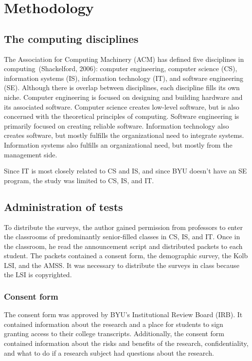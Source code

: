 \chapter{Methodology}\label{chp:chapter3}
\section{The computing disciplines}
The Association for Computing Machinery (ACM) has defined five disciplines in com\-put\-ing~(Shackelford, 2006): computer engineering, computer science (CS), information systems (IS), information technology (IT), and software engineering (SE). Although there is overlap between disciplines, each discipline fills its own niche. Computer engineering is focused on designing and building hardware and its associated software. Computer science creates low-level software, but is also concerned with the theoretical principles of computing. Software engineering is primarily focused on creating reliable software. Information technology also creates software, but mostly fulfills the organizational need to integrate systems. Information systems also fulfills an organizational need, but mostly from the management side.

Since IT is most closely related to CS and IS, and since BYU doesn't have an SE program, the study was limited to CS, IS, and IT.

\section{Administration of tests}
To distribute the surveys, the author gained permission from professors to enter the classrooms of predominantly senior-filled classes in CS, IS, and IT. Once in the classroom, he read the announcement script and distributed packets to each student. The packets contained a consent form, the demographic survey, the Kolb LSI, and the AMSS. It was necessary to distribute the surveys in class because the LSI is copyrighted.

\subsection{Consent form}
The consent form was approved by BYU's Institutional Review Board (IRB). It contained information about the research and a place for students to sign granting access to their college transcripts. Additionally, the consent form contained information about the risks and benefits of the research, confidentiality, and what to do if a research subject had questions about the research.


